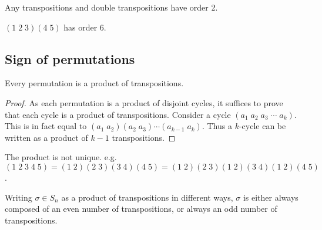 \documentclass[a4pape]{article}
\begin{document}
\begin{eg}
  Any transpositions and double transpositions have order 2.

  $(1\; 2\; 3)(4\; 5)$ has order 6.
\end{eg}

\subsection{Sign of permutations}
\begin{prop}
  Every permutation is a product of transpositions.
\end{prop}

\begin{proof}
  As each permutation is a product of disjoint cycles, it suffices to prove that each cycle is a product of transpositions. Consider a cycle $(a_1\; a_2\; a_3\; \cdots\; a_k)$. This is in fact equal to $(a_1\; a_2)(a_2\; a_3)\cdots (a_{k-1}\; a_k)$. Thus a $k$-cycle can be written as a product of $k - 1$ transpositions.
\end{proof}

\note The product is not unique. e.g. $(1\; 2\; 3\; 4\; 5) =(1\; 2)(2\; 3)(3\; 4)(4\; 5) = (1\; 2)(2\; 3)(1\; 2)(3\; 4)(1\; 2)(4\; 5)$.

\begin{thm}
  Writing $\sigma\in S_n$ as a product of transpositions in different ways, $\sigma$ is either always composed of an even number of transpositions, or always an odd number of transpositions.
\end{thm}
\end{document}
